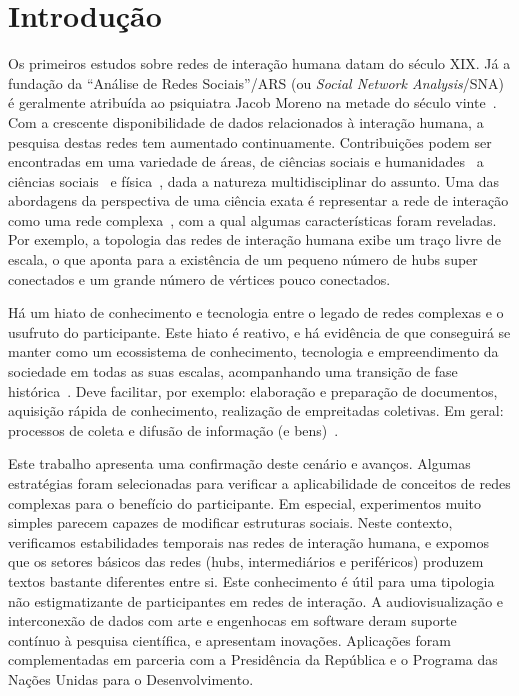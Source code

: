 \documentclass[a4paper,openright,12pt]{report} %
\begin{document}
\chapter{Introdução}
Os primeiros estudos sobre redes de interação humana datam do século XIX. Já a fundação da ``Análise de Redes Sociais''/ARS (ou \emph{Social Network Analysis}/SNA)
é geralmente atribuída ao psiquiatra Jacob Moreno na metade do século vinte~\cite{newmanBook}.
Com a crescente disponibilidade de dados relacionados à interação humana, a pesquisa destas redes tem aumentado continuamente.
Contribuições podem ser encontradas em uma variedade de áreas, de ciências sociais e humanidades~\cite{latour2013}
a ciências sociais~\cite{bird} e física~\cite{barabasiHumanDyn,newmanFriendship},
dada a natureza multidisciplinar do assunto.
Uma das abordagens da perspectiva de uma ciência exata é representar a rede de interação como uma rede
complexa~\cite{barabasiHumanDyn,newmanFriendship},
com a qual algumas características foram reveladas.
Por exemplo, a topologia das redes de interação humana exibe um traço livre de escala,
o que aponta para a existência de um pequeno número de hubs super conectados
e um grande número de vértices pouco conectados.

Há um hiato de conhecimento e tecnologia entre o legado de redes complexas e o usufruto do participante.
Este hiato é reativo, e há evidência de que conseguirá se manter como um ecossistema de conhecimento, tecnologia
e empreendimento da sociedade em todas as suas escalas, acompanhando uma transição de fase histórica~\cite{pentland1}.
Deve facilitar, por exemplo:
elaboração e preparação de documentos, aquisição rápida de conhecimento,
realização de empreitadas coletivas.
Em geral: processos de coleta e difusão de informação (e bens)~\cite{pentland2}.

Este trabalho apresenta uma confirmação deste cenário e avanços.
Algumas estratégias foram selecionadas para verificar a aplicabilidade
de conceitos de redes complexas para o benefício do participante.
Em especial, experimentos muito simples parecem capazes de modificar
estruturas sociais. Neste contexto, verificamos estabilidades temporais
nas redes de interação humana, e expomos que os setores básicos
das redes (hubs, intermediários e periféricos)
produzem textos bastante diferentes entre si.
Este conhecimento é útil para uma tipologia não estigmatizante
de participantes em redes de interação.
A audiovisualização e interconexão de dados com arte e engenhocas
em software deram suporte contínuo à pesquisa científica, e apresentam inovações.
Aplicações foram complementadas em parceria com a Presidência da República
e o Programa das Nações Unidas para o Desenvolvimento.
\end{document}
